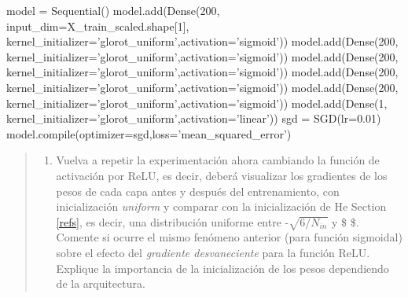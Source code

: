 \documentclass[11pt]{article}
\providecommand{\tightlist}{%
      \setlength{\itemsep}{0pt}\setlength{\parskip}{0pt}}
\newenvironment{Shaded}{}{}
\newcommand{\DecValTok}[1]{\textcolor[rgb]{0.25,0.63,0.44}{{#1}}}
\newcommand{\FloatTok}[1]{\textcolor[rgb]{0.25,0.63,0.44}{{#1}}}
\newcommand{\StringTok}[1]{\textcolor[rgb]{0.25,0.44,0.63}{{#1}}}
\newcommand{\NormalTok}[1]{{#1}}
\newcommand{\OperatorTok}[1]{\textcolor[rgb]{0.40,0.40,0.40}{{#1}}}
\newcommand{\BuiltInTok}[1]{{#1}}
\begin{document}
\begin{Shaded}
\begin{Highlighting}[]
\NormalTok{model }\OperatorTok{=}\NormalTok{ Sequential()}
\NormalTok{model.add(Dense(}\DecValTok{200}\NormalTok{, input_dim}\OperatorTok{=}\NormalTok{X_train_scaled.shape[}\DecValTok{1}\NormalTok{], kernel_initializer}\OperatorTok{=}\StringTok{'glorot_uniform'}\NormalTok{,activation}\OperatorTok{=}\StringTok{'sigmoid'}\NormalTok{))}
\NormalTok{model.add(Dense(}\DecValTok{200}\NormalTok{, kernel_initializer}\OperatorTok{=}\StringTok{'glorot_uniform'}\NormalTok{,activation}\OperatorTok{=}\StringTok{'sigmoid'}\NormalTok{))}
\NormalTok{model.add(Dense(}\DecValTok{200}\NormalTok{,  kernel_initializer}\OperatorTok{=}\StringTok{'glorot_uniform'}\NormalTok{,activation}\OperatorTok{=}\StringTok{'sigmoid'}\NormalTok{))}
\NormalTok{model.add(Dense(}\DecValTok{200}\NormalTok{, kernel_initializer}\OperatorTok{=}\StringTok{'glorot_uniform'}\NormalTok{,activation}\OperatorTok{=}\StringTok{'sigmoid'}\NormalTok{))}
\NormalTok{model.add(Dense(}\DecValTok{200}\NormalTok{, kernel_initializer}\OperatorTok{=}\StringTok{'glorot_uniform'}\NormalTok{,activation}\OperatorTok{=}\StringTok{'sigmoid'}\NormalTok{))}
\NormalTok{model.add(Dense(}\DecValTok{1}\NormalTok{, kernel_initializer}\OperatorTok{=}\StringTok{'glorot_uniform'}\NormalTok{,activation}\OperatorTok{=}\StringTok{'linear'}\NormalTok{))}
\NormalTok{sgd }\OperatorTok{=}\NormalTok{ SGD(lr}\OperatorTok{=}\FloatTok{0.01}\NormalTok{)}
\NormalTok{model.}\BuiltInTok{compile}\NormalTok{(optimizer}\OperatorTok{=}\NormalTok{sgd,loss}\OperatorTok{=}\StringTok{'mean_squared_error'}\NormalTok{)}
\end{Highlighting}
\end{Shaded}

\begin{quote}
\begin{enumerate}
\def\labelenumi{\alph{enumi})}
\setcounter{enumi}{4}
\tightlist
\item
  Vuelva a repetir la experimentación ahora cambiando la función de
  activación por ReLU, es decir, deberá visualizar los gradientes de los
  pesos de cada capa antes y después del entrenamiento, con
  inicialización \emph{uniform} y comparar con la inicialización de He
  Section \ref{refs}, es decir, una distribución uniforme entre
  -\(\sqrt{6/N_{in}}\) y \$ \$. Comente si ocurre el
  mismo fenómeno anterior (para función sigmoidal) sobre el efecto del
  \emph{gradiente desvaneciente} para la función ReLU. Explique la
  importancia de la inicialización de los pesos dependiendo de la
  arquitectura.
\end{enumerate}
\end{quote}
\end{document}
